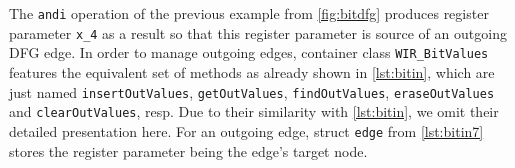 The \texttt{andi} operation of the previous example from \cref{fig:bitdfg} produces register parameter \texttt{x\_4} as a result so that this register parameter is source of an outgoing \gls{DFG} edge.
In order to manage outgoing edges, container class \texttt{WIR\_BitValues} features the equivalent set of methods as already shown in \cref{lst:bitin}, which are just named \texttt{insertOutValues}, \texttt{getOutValues}, \texttt{findOutValues}, \texttt{eraseOutValues} and \texttt{clearOutValues}, resp.
Due to their similarity with \cref{lst:bitin}, we omit their detailed presentation here.
For an outgoing edge, struct \texttt{edge} from \cref{lst:bitin7} stores the register parameter being the edge's target node.


\cleardoubleoddpage
